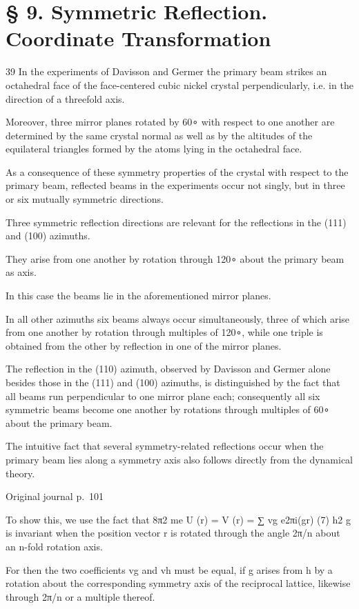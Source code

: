 \documentclass[10pt]{article}
\newcommand{\origpage}[1]{\par\medskip\noindent\hfill{\small\color{notegray}Original journal p.~#1}\hfill\mbox{}\par\smallskip}
\begin{document}
\section*{§ 9. Symmetric Reflection. Coordinate Transformation}
39 In the experiments of Davisson and Germer the primary beam strikes an octahedral face of the face-centered cubic nickel crystal perpendicularly, i.e. in the direction of a threefold axis.\par
Moreover, three mirror planes rotated by 60∘ with respect to one another are determined by the same crystal normal as well as by the altitudes of the equilateral triangles formed by the atoms lying in the octahedral face.\par
As a consequence of these symmetry properties of the crystal with respect to the primary beam, reflected beams in the experiments occur not singly, but in three or six mutually symmetric directions.\par
Three symmetric reflection directions are relevant for the reflections in the (111) and (100) azimuths.\par
They arise from one another by rotation through 120∘ about the primary beam as axis.\par
In this case the beams lie in the aforementioned mirror planes.\par
In all other azimuths six beams always occur simultaneously, three of which arise from one another by rotation through multiples of 120∘, while one triple is obtained from the other by reflection in one of the mirror planes.\par
The reflection in the (110) azimuth, observed by Davisson and Germer alone besides those in the (111) and (100) azimuths, is distinguished by the fact that all beams run perpendicular to one mirror plane each; consequently all six symmetric beams become one another by rotations through multiples of 60∘ about the primary beam.\par
The intuitive fact that several symmetry-related reflections occur when the primary beam lies along a symmetry axis also follows directly from the dynamical theory.\par
\origpage{101}
To show this, we use the fact that 8π2 me U (r) = V (r) = ∑ vg e2πi(gr) (7) h2 g is invariant when the position vector r is rotated through the angle 2π/n about an n-fold rotation axis.\par
For then the two coefficients vg and vh must be equal, if g arises from h by a rotation about the corresponding symmetry axis of the reciprocal lattice, likewise through 2π/n or a multiple thereof.\par
\end{document}
